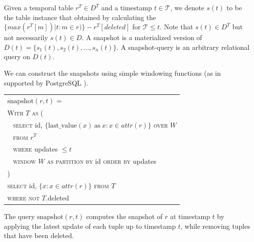\begin{defn} 
	Given a temporal table $r^T \in D^T$ and a timestamp $t \in \mathcal{T}$, we denote $s(t)$ to be the table instance that obtained by calculating the $\{max(r^T[m])|t : m\in r)\}-r^T[deleted]$ for $\mathcal{T}\leq t$. Note that $s(t) \in D^T$ but not necessarily $s(t) \in D$. A snapshot is a materialized version of $D(t) = \{s_1(t),s_2(t),...,s_n(t)\}$. A snapshot-query is an arbitrary relational query on $D(t)$.
\label{dfn:snapshot}
\end{defn}

We can construct the snapshots using simple windowing functions (as in supported by PostgreSQL \cite{momjian2001postgresql}).

    \vspace{1em}
\begin{center}

{\small
	\begin{tabular}{|l|} \hline
		$\mathrm{snapshot}(r, t)$ = \\
		\verb|| \textsc{With} $T$ \textsc{as} ( \\
		\verb| | \textsc{select} id, $\{\mathrm{last\_value}(x) \mathrm{\ as\ } x:
		x\in attr(r)\}$ \textsc{over} $W$ \\
		\verb| | \textsc{from} $r^T$ \\
		\verb| | \textsc{where} updates $\leq t$ \\
		\verb| | \textsc{window} $W$ \textsc{as} 
		\textsc{partition by} id \textsc{order by} updates\\
		\verb|| ) \\
		\verb|| \textsc{select} id, $\{x: x\in attr(r)\}$ \textsc{from} $T$ \\
		\verb|| \textsc{where not} $T.$deleted \\ \hline
	\end{tabular}
}
\end{center}

The query $\mathrm{snapshot}(r, t)$ computes the snapshot of $r$ at timestamp $t$ by applying the latest update of each tuple up to timestamp $t$, while removing tuples that have been deleted.



